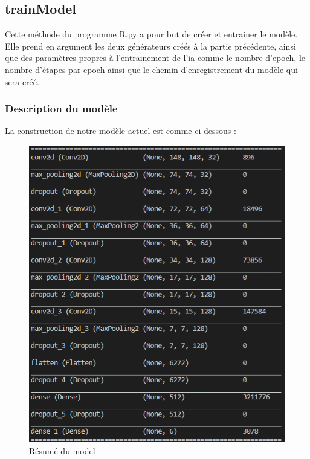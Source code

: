 \documentclass[12pt ,a4paper ]{article}
\begin{document}
\begin{multicols}{2}
\subsection{trainModel}
Cette méthode du programme R.py a pour but de créer et entrainer le modèle. Elle prend en argument les deux générateurs créés à la partie précédente, ainsi que des paramètres propres à l’entrainement de l’ia comme le nombre d’epoch, le nombre d’étapes par epoch ainsi que le chemin d’enregistrement du modèle qui sera créé.\\

\subsubsection{Description du modèle}
La construction de notre modèle actuel est comme ci-dessous : 

\begin{figure}[H]
    \begin{center}
        \includegraphics[scale=0.62]{./img/model_sum.png}
    \end{center}
\caption{\small{Résumé du model}}
\end{figure}


\end{multicols}
\end{document}
